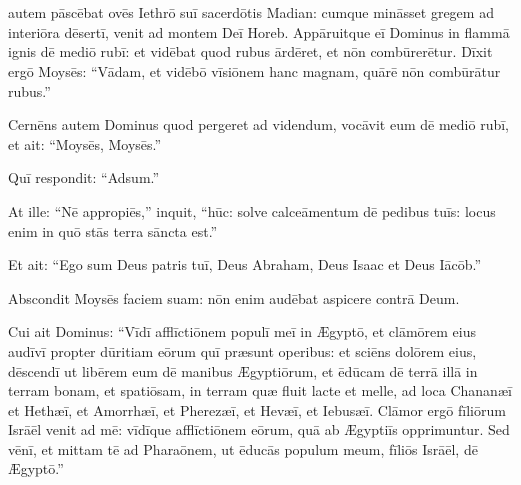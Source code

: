 \chapter{}

\thispagestyle{empty}

 autem pāscēbat ovēs Iethrō suī sacerdōtis Madian:
cumque mināsset gregem ad interiōra dēsertī,
venit ad montem Deī Horeb.
Appāruitque eī Dominus in flammā ignis dē mediō rubī:
et vidēbat quod rubus ārdēret, et nōn combūrerētur.
Dīxit ergō Moysēs: ``Vādam, et vidēbō vīsiōnem hanc magnam, quārē nōn combūrātur rubus.''

Cernēns autem Dominus quod pergeret ad videndum,
vocāvit eum dē mediō rubī, et ait: ``Moysēs, Moysēs.''

Quī respondit: ``Adsum.''

At ille: ``Nē appropiēs,'' inquit, ``hūc: solve calceāmentum dē pedibus tuīs: locus enim
in quō stās terra sāncta est.'' 

Et ait: ``Ego sum Deus patris tuī, Deus Abraham, Deus Isaac et Deus Iācōb.''

Abscondit Moysēs faciem suam: nōn enim audēbat aspicere contrā Deum.

Cui ait Dominus: ``Vīdī afflīctiōnem populī meī in Ægyptō,
et clāmōrem eius audīvī propter dūritiam eōrum quī præsunt operibus:
et sciēns dolōrem eius, dēscendī ut libērem eum dē manibus Ægyptiōrum,
et ēdūcam dē terrā illā in terram bonam, et spatiōsam,
in terram quæ fluit lacte et melle,
 ad loca Chananæī et Hethæī, et Amorrhæī, et Pherezæī, et Hevæī, et Iebusæī.
Clāmor ergō fīliōrum Isrāēl venit ad mē: vīdīque afflīctiōnem eōrum,
quā ab Ægyptiīs opprimuntur.
Sed vēnī, et mittam tē ad Pharaōnem,
ut ēducās populum meum, fīliōs Isrāēl, dē Ægyptō.''

